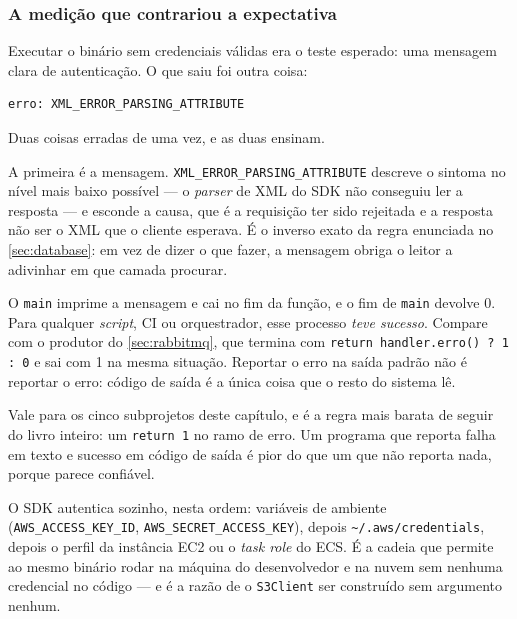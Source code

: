 \subsubsection{A medição que contrariou a expectativa}

Executar o binário sem credenciais válidas era o teste esperado: uma mensagem
clara de autenticação. O que saiu foi outra coisa:

\begin{lstlisting}[style=bt, language=bash,
    caption={Saída medida de \texttt{./dist/bin/aws-s3} sem credenciais
             configuradas. Código de saída do processo: \textbf{0}.}]
erro: XML_ERROR_PARSING_ATTRIBUTE
\end{lstlisting}

Duas coisas erradas de uma vez, e as duas ensinam.

A primeira é a mensagem. \texttt{XML\_ERROR\_PARSING\_ATTRIBUTE} descreve o
sintoma no nível mais baixo possível --- o \emph{parser} de XML do SDK não
conseguiu ler a resposta --- e esconde a causa, que é a requisição ter sido
rejeitada e a resposta não ser o XML que o cliente esperava. É o inverso
exato da regra enunciada no \cref{sec:database}: em vez de dizer o que fazer,
a mensagem obriga o leitor a adivinhar em que camada procurar.

\begin{armadilha}
O \texttt{main} imprime a mensagem e cai no fim da função, e o fim de
\texttt{main} devolve 0. Para qualquer \emph{script}, CI ou orquestrador, esse
processo \emph{teve sucesso}. Compare com o produtor do \cref{sec:rabbitmq},
que termina com \texttt{return handler.erro() ? 1 : 0} e sai com 1 na mesma
situação. Reportar o erro na saída padrão não é reportar o erro: código de
saída é a única coisa que o resto do sistema lê.
\end{armadilha}

\begin{regra}
Vale para os cinco subprojetos deste capítulo, e é a regra mais barata de
seguir do livro inteiro: um \texttt{return 1} no ramo de erro. Um programa que
reporta falha em texto e sucesso em código de saída é pior do que um que não
reporta nada, porque parece confiável.
\end{regra}

O SDK autentica sozinho, nesta ordem: variáveis de ambiente
(\texttt{AWS\_ACCESS\_KEY\_ID}, \texttt{AWS\_SECRET\_ACCESS\_KEY}), depois
\texttt{\textasciitilde/.aws/credentials}, depois o perfil da instância EC2 ou o
\emph{task role} do ECS. É a cadeia que permite ao mesmo binário rodar na
máquina do desenvolvedor e na nuvem sem nenhuma credencial no código --- e é a
razão de o \texttt{S3Client} ser construído sem argumento nenhum.

